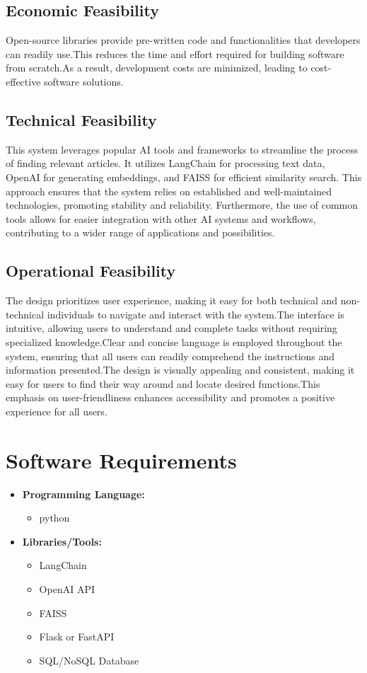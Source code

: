 \documentclass[12pt,a4paper]{report}
\begin{document}
{\subsection{Economic Feasibility}
Open-source libraries provide pre-written code and functionalities that developers can readily use.This reduces the time and effort required for building software from scratch.As a result, development costs are minimized, leading to cost-effective software solutions.
\subsection{Technical Feasibility}
This system leverages popular AI tools and frameworks to streamline the process of finding relevant articles. It utilizes LangChain for processing text data, OpenAI for generating embeddings, and FAISS for efficient similarity search. This approach ensures that the system relies on established and well-maintained technologies, promoting stability and reliability. Furthermore, the use of common tools allows for easier integration with other AI systems and workflows, contributing to a wider range of applications and possibilities.
\subsection{Operational Feasibility}
The design prioritizes user experience, making it easy for both technical and non-technical individuals to navigate and interact with the system.The interface is intuitive, allowing users to understand and complete tasks without requiring specialized knowledge.Clear and concise language is employed throughout the system, ensuring that all users can readily comprehend the instructions and information presented.The design is visually appealing and consistent, making it easy for users to find their way around and locate desired functions.This emphasis on user-friendliness enhances accessibility and promotes a positive experience for all users.


\section{Software Requirements}
\begin{itemize}
    \item \textbf{Programming Language:}
    \begin{itemize}
        \item python
    \end{itemize}
    \item \textbf{Libraries/Tools:}
    \begin{itemize}
        \item LangChain
        \item OpenAI API
        \item FAISS
        \item Flask or FastAPI
        \item SQL/NoSQL Database
    \end{itemize}
\end{itemize}
}
\end{document}
